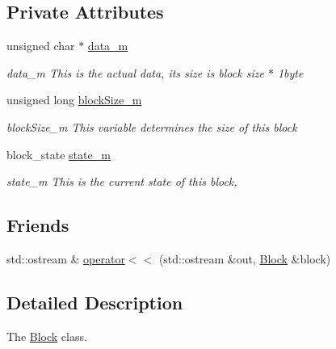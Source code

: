 \subsection*{Private Attributes}
\begin{DoxyCompactItemize}
\item 
\mbox{\label{classlogic_1_1_block_afa168ce1afb85db10a312e0288bfee1f}} 
unsigned char $\ast$ \mbox{\hyperlink{classlogic_1_1_block_afa168ce1afb85db10a312e0288bfee1f}{data\+\_\+m}}
\begin{DoxyCompactList}\small\item\em data\+\_\+m This is the actual data, its size is block size $\ast$ 1byte \end{DoxyCompactList}\item 
\mbox{\label{classlogic_1_1_block_a2e11cf21efb27e54d8e4b18b5f7fa091}} 
unsigned long \mbox{\hyperlink{classlogic_1_1_block_a2e11cf21efb27e54d8e4b18b5f7fa091}{block\+Size\+\_\+m}}
\begin{DoxyCompactList}\small\item\em block\+Size\+\_\+m This variable determines the size of this block \end{DoxyCompactList}\item 
block\+\_\+state \mbox{\hyperlink{classlogic_1_1_block_ae267e23894435a8a93368db5af0519be}{state\+\_\+m}}
\begin{DoxyCompactList}\small\item\em state\+\_\+m This is the current state of this block, \end{DoxyCompactList}\end{DoxyCompactItemize}
\subsection*{Friends}
\begin{DoxyCompactItemize}
\item 
std\+::ostream \& \mbox{\hyperlink{classlogic_1_1_block_a822a522e43e47d065d5c56a2103e08a3}{operator$<$$<$}} (std\+::ostream \&out, \mbox{\hyperlink{classlogic_1_1_block}{Block}} \&block)
\end{DoxyCompactItemize}


\subsection{Detailed Description}
The \mbox{\hyperlink{classlogic_1_1_block}{Block}} class. 


